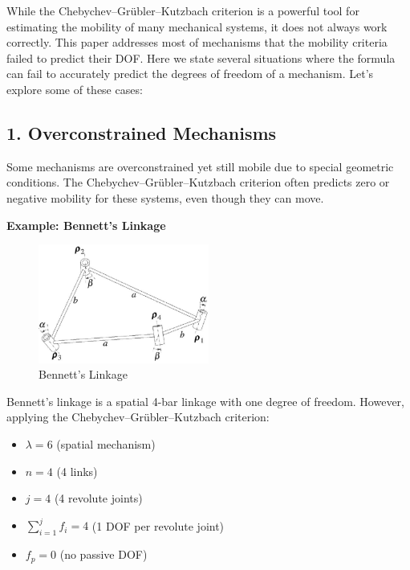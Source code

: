 \begin{solution}
	
    While the Chebychev–Grübler–Kutzbach criterion is a powerful tool for estimating the mobility of many mechanical systems, it does not always work correctly. This paper \cite{gogu2005chebychev} addresses most of mechanisms that the mobility criteria failed to predict their DOF. Here we state  several situations where the formula can fail to accurately predict the degrees of freedom of a mechanism. Let's explore some of these cases:

    \subsection*{1. Overconstrained Mechanisms}
    Some mechanisms are overconstrained yet still mobile due to special geometric conditions. The Chebychev–Grübler–Kutzbach criterion often predicts zero or negative mobility for these systems, even though they can move.

	

    \textbf{Example: Bennett's Linkage}
    \begin{figure}[H]
        \centering
        \includegraphics[width=0.5\textwidth]{The-Bennett-linkage-and-its-geometric-description-22_Q640.jpg}
        \caption{Bennett's Linkage \cite{lu2017approximation}}
        \label{fig:bennett_linkage}
    \end{figure}

    Bennett's linkage is a spatial 4-bar linkage with one degree of freedom. However, applying the Chebychev–Grübler–Kutzbach criterion:

    \begin{itemize}
        \item $\lambda = 6$ (spatial mechanism)
        \item $n = 4$ (4 links)
        \item $j = 4$ (4 revolute joints)
        \item $\sum_{i=1}^j f_i = 4$ (1 DOF per revolute joint)
        \item $f_p = 0$ (no passive DOF)
    \end{itemize}


\end{solution}
